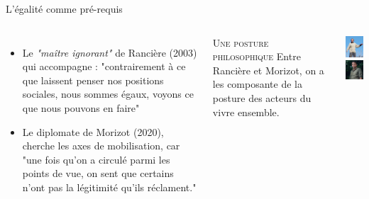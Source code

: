 \documentclass[newPxFont]{beamer}
\begin{document}
\begin{frame}[c]{L'égalité comme pré-requis}
  \vspace{-1cm}
  \begin{columns}[onlytextwidth,T]
    \column{\dimexpr\linewidth-30mm-5mm}
        \begin{itemize}
          \item Le \textit{"maître ignorant"} de Rancière (2003) qui accompagne : "contrairement à ce que laissent penser nos positions sociales, nous sommes égaux, voyons ce que nous pouvons en faire" 
          \item Le diplomate de Morizot (2020),  cherche les axes de mobilisation, car "une fois qu’on a circulé parmi les points de vue, on sent que certains n’ont pas la légitimité qu’ils réclament."
        \end{itemize}
  
        \small{
            \begin{alertblock}{\textsc{Une posture philosophique}}
              Entre Rancière et Morizot, on a les composante de la posture des acteurs du vivre ensemble.
            \end{alertblock}
          }
    \column{30mm}
    \vspace{0.5cm}
          \includegraphics[width=3cm]{img/Ranciere.jpg}\\
          \includegraphics[width=3cm]{img/morizot.jpg}
  \end{columns}
\end{frame}
\end{document}
